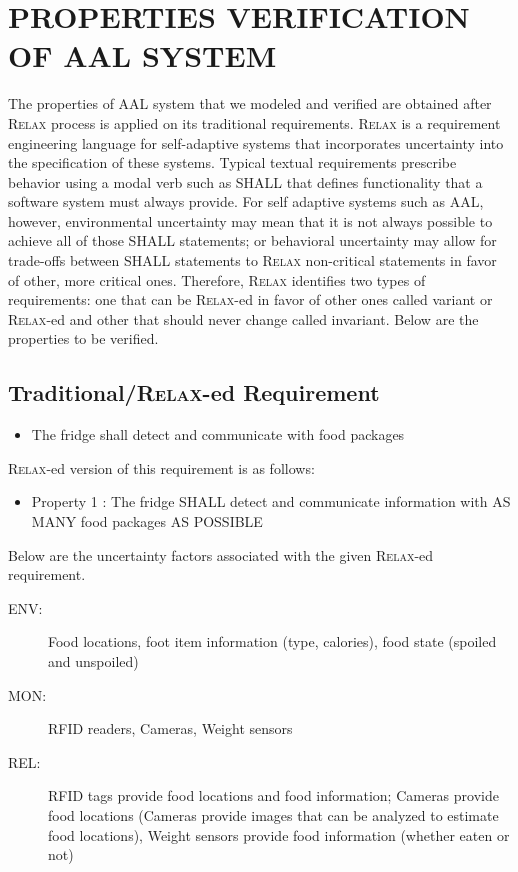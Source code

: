 \documentclass[a4paper,twoside]{article}
\def\myrelax{\textsc{Relax}}                  %
\begin{document}
\section{\uppercase{Properties Verification of AAL system}}
\label{sec:properties}
The properties of AAL system that we modeled and verified are obtained after \myrelax{} process is applied on its traditional requirements. \myrelax{}  is  a  requirement  engineering language for self-adaptive systems that incorporates uncertainty into the specification of these systems. Typical  textual  requirements  prescribe behavior  using  a  modal  verb  such  as  SHALL  that defines  functionality  that  a  software  system  must always provide. For self adaptive systems such as AAL, however, environmental  uncertainty  may  mean  that  it  is  not always  possible  to  achieve  all  of  those  SHALL statements; or behavioral uncertainty may allow for trade-offs between SHALL statements to \myrelax{} non-critical  statements  in  favor  of  other,  more  critical ones.  Therefore,  \myrelax{} identifies two types of requirements: one that can be \myrelax{}-ed in favor of other ones called variant or \myrelax{}-ed and other that should never change called invariant.
Below are the properties to be verified. 

\subsection{Traditional/\myrelax{}-ed Requirement}

\begin{itemize}
\item The fridge shall detect and communicate with food packages
\end{itemize}

\myrelax{}-ed version of this requirement is as follows:

\begin{itemize}
\item Property 1 : The fridge SHALL detect and communicate information with AS MANY food packages AS POSSIBLE
\end{itemize}

Below are the uncertainty factors associated with the given \myrelax{}-ed requirement.

\begin{description}
\item[ENV:] Food locations, foot item information (type, calories), food state (spoiled and unspoiled)
\item[MON:] RFID readers, Cameras, Weight sensors
\item[REL:] RFID tags provide food locations and food information; Cameras provide food locations (Cameras provide images that can be analyzed to estimate food locations), Weight sensors provide food information (whether eaten or not)
\end{description}
\end{document}
